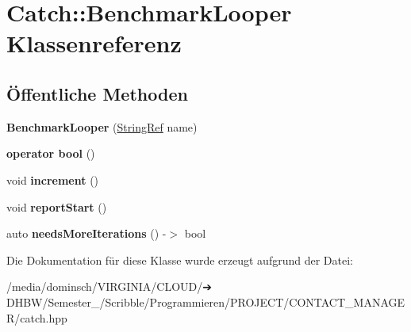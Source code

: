\hypertarget{classCatch_1_1BenchmarkLooper}{}\section{Catch\+:\+:Benchmark\+Looper Klassenreferenz}
\label{classCatch_1_1BenchmarkLooper}
\subsection*{Öffentliche Methoden}
\begin{DoxyCompactItemize}
\item 
\mbox{\label{classCatch_1_1BenchmarkLooper_ab9ba6397306a70082f39e63a8a71bde6}} 
{\bfseries Benchmark\+Looper} (\hyperlink{classCatch_1_1StringRef}{String\+Ref} name)
\item 
\mbox{\label{classCatch_1_1BenchmarkLooper_a54da41bada9da038dc05faf41d746765}} 
{\bfseries operator bool} ()
\item 
\mbox{\label{classCatch_1_1BenchmarkLooper_a210552aff5b19408637444d4bb35d59c}} 
void {\bfseries increment} ()
\item 
\mbox{\label{classCatch_1_1BenchmarkLooper_a0697d1b266112b110edf2025b82c4e77}} 
void {\bfseries report\+Start} ()
\item 
\mbox{\label{classCatch_1_1BenchmarkLooper_a97bd944521f519b1593a5d1d2f9998fa}} 
auto {\bfseries needs\+More\+Iterations} () -\/$>$ bool
\end{DoxyCompactItemize}


Die Dokumentation für diese Klasse wurde erzeugt aufgrund der Datei\+:\begin{DoxyCompactItemize}
\item 
/media/dominsch/\+V\+I\+R\+G\+I\+N\+I\+A/\+C\+L\+O\+U\+D/➔ D\+H\+B\+W/\+Semester\+\_/\+Scribble/\+Programmieren/\+P\+R\+O\+J\+E\+C\+T/\+C\+O\+N\+T\+A\+C\+T\+\_\+\+M\+A\+N\+A\+G\+E\+R/catch.\+hpp\end{DoxyCompactItemize}
